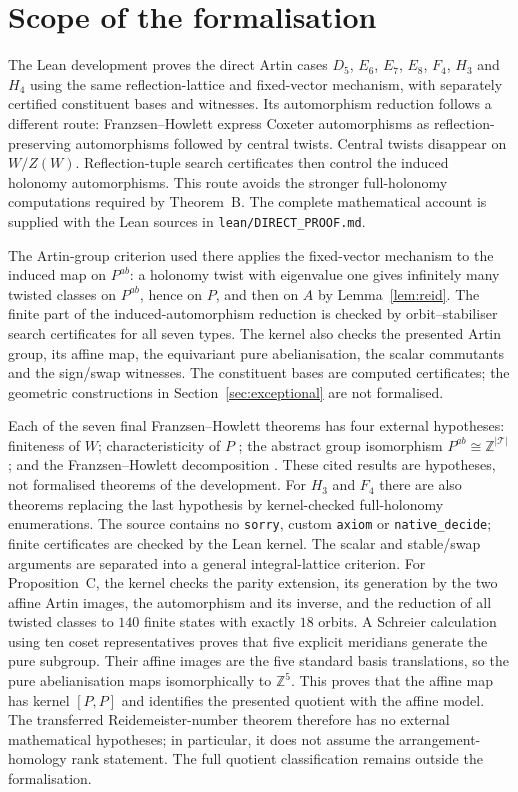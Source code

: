 \documentclass[11pt]{article}
\theoremstyle{definition}
\newcommand{\Z}{\mathbb{Z}}
\newcommand{\T}{\mathcal{T}}
\begin{document}
\section{Scope of the formalisation}\label{app:artin}

The Lean development proves the direct Artin cases
$D_5$, $E_6$, $E_7$, $E_8$, $F_4$, $H_3$ and $H_4$ using the same reflection-lattice and fixed-vector
mechanism, with separately certified constituent bases and witnesses. Its automorphism reduction follows a different route:
Franzsen--Howlett \cite[Thm.~31]{FH03} express Coxeter automorphisms as reflection-preserving
automorphisms followed by central twists. Central twists disappear on $W/Z(W)$.
Reflection-tuple search certificates then control the induced holonomy automorphisms.
This route avoids the stronger full-holonomy computations required by Theorem~B.
The complete mathematical account is supplied with the Lean sources in
\texttt{lean/DIRECT\_PROOF.md}.

The Artin-group criterion used there applies the fixed-vector mechanism to the induced map
on $P^{ab}$: a holonomy twist with eigenvalue one gives infinitely many twisted classes on
$P^{ab}$, hence on $P$, and then on $A$ by Lemma~\ref{lem:reid}.
The finite part of the induced-automorphism reduction is checked by orbit--stabiliser search
certificates for all seven types. The kernel also checks the presented Artin group, its affine map,
the equivariant pure abelianisation, the scalar commutants and the sign/swap witnesses.
The constituent bases are computed certificates; the geometric constructions in
Section~\ref{sec:exceptional} are not formalised.

Each of the seven final Franzsen--Howlett theorems has four external hypotheses:
finiteness of $W$; characteristicity of $P$ \cite{CP03};
the abstract group isomorphism $P^{ab}\cong\Z^{|\T|}$ \cite{Bri71}; and the
Franzsen--Howlett decomposition \cite[Thm.~31]{FH03}.
These cited results are hypotheses, not formalised theorems of the development.
For $H_3$ and $F_4$ there are also theorems replacing the last hypothesis by kernel-checked
full-holonomy enumerations. The source contains no \texttt{sorry}, custom \texttt{axiom}
or \texttt{native\_decide}; finite certificates are checked by the Lean kernel.
The scalar and stable/swap arguments are separated into a general integral-lattice criterion.
For Proposition~C, the kernel checks the parity extension, its generation by the two affine
Artin images, the automorphism and its inverse, and the reduction of all twisted classes to
$140$ finite states with exactly $18$ orbits. A Schreier calculation using ten coset representatives
proves that five explicit meridians generate the pure subgroup. Their affine images are the
five standard basis translations, so the pure abelianisation maps isomorphically to $\Z^5$.
This proves that the affine map has kernel $[P,P]$ and identifies the presented quotient with
the affine model. The transferred Reidemeister-number theorem therefore has no external
mathematical hypotheses; in particular, it does not assume the arrangement-homology rank statement.
The full quotient classification remains outside the formalisation.
\end{document}
